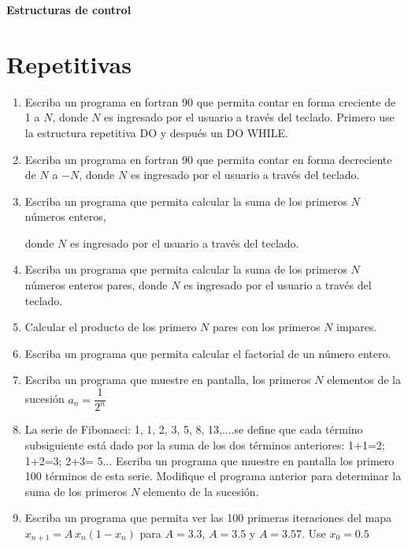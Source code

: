 \documentclass[11pt]{exam}
\begin{document}
\firstpageheadrule
\runningheadrule
{}
\cfoot{ }
\begin{flushleft}
\vspace{0.2in}
\vspace{0.25cm}
\end{flushleft}

\begin{large}\textbf{Estructuras de control }  \end{large}
\section{Repetitivas}
\begin{enumerate}
 \item 
Escriba un programa en  fortran 90 que permita contar en forma creciente de 1 a $N$, donde $N$ es 
ingresado por el usuario a trav\'es del teclado. Primero use la estructura repetitiva DO y despu\'es un DO WHILE.
\item 
Escriba un programa en  fortran 90 que permita contar en forma decreciente de $N$ a $-N$, 
donde $N$ es ingresado por el usuario a trav\'es del teclado.
\item 
Escriba un programa que permita calcular la suma de los primeros $N$ n\'umeros enteros, 

donde $N$ es ingresado por el usuario a trav\'es del teclado.
\item 
Escriba un programa que permita calcular la suma de los primeros $N$ n\'umeros enteros pares, 
donde $N$ es ingresado por el usuario a trav\'es del teclado.
\item 
Calcular el producto de los primero $N$ pares con los primeros $N$ impares.
\item 
Escriba un programa que permita calcular el factorial de un n\'umero entero.
\item 
Escriba un programa  que muestre en pantalla, los primeros $N$ elementos de la sucesi\'on
$a_{n}=\dfrac{1}{2^{n}}$
\item 
La serie de Fibonacci: 1, 1, 2, 3, 5, 8, 13,....se define que cada t\'ermino subsiguiente 
 est\'a dado por la suma de los dos t\'erminos anteriores: 1+1=2;  1+2=3;  2+3= 5...
Escriba un programa que muestre en pantalla los primero 100 t\'erminos de esta serie.
Modifique el programa anterior para determinar la suma de los primeros $N$ elemento de la sucesi\'on.
\item 
Escriba un programa  que permita ver las 100 primeras iteraciones del mapa
$x_{n+1}=A\,x_{n}(1-x_{n}) $  para $A= 3.3$,  $A= 3.5$   y  $A=3. 57$. Use $x_{0}= 0.5$

\end{enumerate}
\end{document}

